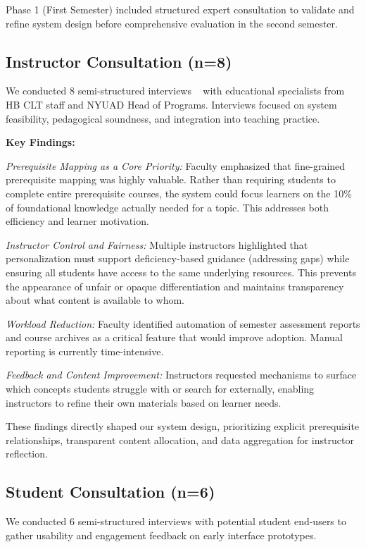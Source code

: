 \documentclass{stylefiles/capstone}
\begin{document}
Phase 1 (First Semester) included structured expert consultation to validate and refine system design before comprehensive evaluation in the second semester.

\subsection{Instructor Consultation (n=8)}

We conducted 8 semi-structured interviews ~\cite{article} with educational specialists from HB CLT staff and NYUAD Head of Programs. Interviews focused on system feasibility, pedagogical soundness, and integration into teaching practice.

\textbf{Key Findings:}

\textit{Prerequisite Mapping as a Core Priority:} Faculty emphasized that fine-grained prerequisite mapping was highly valuable. Rather than requiring students to complete entire prerequisite courses, the system could focus learners on the 10\% of foundational knowledge actually needed for a topic. This addresses both efficiency and learner motivation.

\textit{Instructor Control and Fairness:} Multiple instructors highlighted that personalization must support deficiency-based guidance (addressing gaps) while ensuring all students have access to the same underlying resources. This prevents the appearance of unfair or opaque differentiation and maintains transparency about what content is available to whom.

\textit{Workload Reduction:} Faculty identified automation of semester assessment reports and course archives as a critical feature that would improve adoption. Manual reporting is currently time-intensive.

\textit{Feedback and Content Improvement:} Instructors requested mechanisms to surface which concepts students struggle with or search for externally, enabling instructors to refine their own materials based on learner needs.

These findings directly shaped our system design, prioritizing explicit prerequisite relationships, transparent content allocation, and data aggregation for instructor reflection.

\subsection{Student Consultation (n=6)}

We conducted 6 semi-structured interviews with potential student end-users to gather usability and engagement feedback on early interface prototypes.
\end{document}
